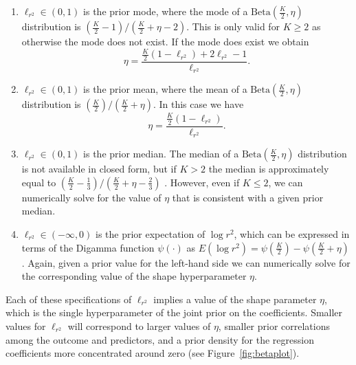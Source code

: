 \documentclass[11pt]{article}
\newcommand{\locRsq}{\ell_{r^2}}
\newcommand{\halfK}{\frac{K}{2}}
\newcommand{\Betadist}[2]{\mathrm{Beta}\left(#1,#2\right)}
\newcommand{\Digamma}[1]{\psi\left(#1\right)}
\begin{document}
\begin{enumerate}
\item $\locRsq \in \left(0,1\right)$ is the prior mode, where the mode of a
$\Betadist{\halfK}{\eta}$ distribution is
$\left(\halfK - 1\right) / \left(\halfK + \eta - 2\right)$.
This is only valid for $K \geq 2$ as otherwise the mode does not exist. If
the mode does exist we obtain
$$\eta = \frac{\halfK \left(1 - \locRsq\right) + 2\locRsq - 1}{\locRsq}.$$

\item $\locRsq \in \left(0,1\right)$ is the prior mean, where the mean of a
$\Betadist{\halfK}{\eta}$ distribution is
$\left(\halfK\right) / \left(\halfK + \eta\right)$. In this case we have
$$\eta = \frac{\halfK \left(1 - \locRsq \right)}{\locRsq}.$$


\item $\locRsq \in \left(0,1\right)$ is the prior median. The median of a
$\Betadist{\halfK}{\eta}$ distribution is not available in closed form, but if
$K > 2$ the median is approximately equal to \newline
$\left(\halfK - \frac{1}{3}\right) / \left(\halfK + \eta - \frac{2}{3}\right)$
\cite{kerman}. However, even if $K \leq 2$, we can numerically solve for the
value of $\eta$ that is consistent with a given prior median.

\item $\locRsq \in \left(-\infty,0\right)$ is the prior expectation of
$\log{r^2}$, which can be expressed in terms of the Digamma function
$\Digamma{\cdot}$ as
$E\left(\log{r^2}\right) = \Digamma{\halfK} - \Digamma{\halfK + \eta}$. Again,
given a prior value for the left-hand side we can numerically solve for the
corresponding value of the shape hyperparameter $\eta$.
\end{enumerate}

Each of these specifications of $\locRsq$ implies a value of the shape parameter
$\eta$, which is the single hyperparameter of the joint prior on the
coefficients. Smaller values for $\locRsq$ will correspond to larger values of
$\eta$, smaller prior correlations among the outcome and predictors, and a prior
density for the regression coefficients more concentrated around zero (see
Figure~\ref{fig:betaplot}).
\end{document}
